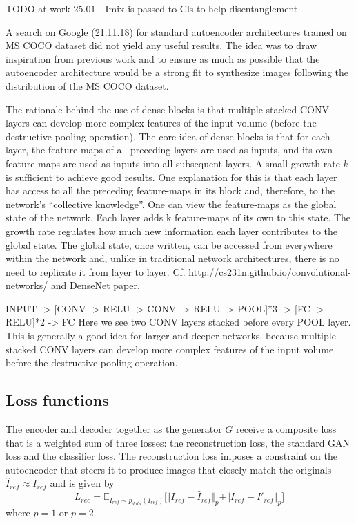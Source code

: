 \documentclass[12pt,a4paper]{article}
\begin{document}
TODO at work 25.01
- Imix is passed to Cls to help disentanglement





\par A search on Google (21.11.18) for standard autoencoder architectures trained on MS COCO dataset did not yield any useful results. The idea was to draw inspiration from previous work and to ensure as much as possible that the autoencoder architecture would be a strong fit to synthesize images following the distribution of the MS COCO dataset.

\par The rationale behind the use of dense blocks is that multiple stacked CONV layers can develop more complex features of the input volume (before the destructive pooling operation). The core idea of dense blocks is that for each layer, the feature-maps of all preceding layers are used as inputs, and its own feature-maps are used as inputs into all subsequent layers. A small growth rate $k$ is sufficient to achieve good results. One explanation for this is that each layer has access to all the preceding feature-maps in its block and, therefore, to the network’s “collective knowledge”. One can view the feature-maps as the global state of the network. Each layer adds k feature-maps of its own to this state. The growth
rate regulates how much new information each layer contributes to the global state. The global state, once written, can be accessed from everywhere within the network and, unlike in traditional network architectures, there is no need to replicate it from layer to layer.
Cf. http://cs231n.github.io/convolutional-networks/ and DenseNet paper.

\par INPUT -> [CONV -> RELU -> CONV -> RELU -> POOL]*3 -> [FC -> RELU]*2 -> FC
Here we see two CONV layers stacked before every POOL layer. This is generally a good
idea for larger and deeper networks, because multiple stacked CONV layers can develop
more complex features of the input volume before the destructive pooling operation.

\subsection{Loss functions}
The encoder and decoder together as the generator $G$ receive a composite loss that is a weighted sum of three losses: the reconstruction loss, the standard GAN loss and the classifier loss. The reconstruction loss imposes a constraint on the autoencoder that steers it to produce images that closely match the originals $\hat{I}_{ref} \approx I_{ref}$ and is given by
\begin{equation} \label{eq:4}
    L_{rec} = \mathbb{E}_{I_{ref}\sim p_{data} (I_{ref})}\big[ \Vert I_{ref} - \hat{I}_{ref} \Vert_p + \Vert I_{ref} - I'_{ref} \Vert_p \big]
\end{equation}
where $p = 1$ or $p = 2$.
\end{document}
